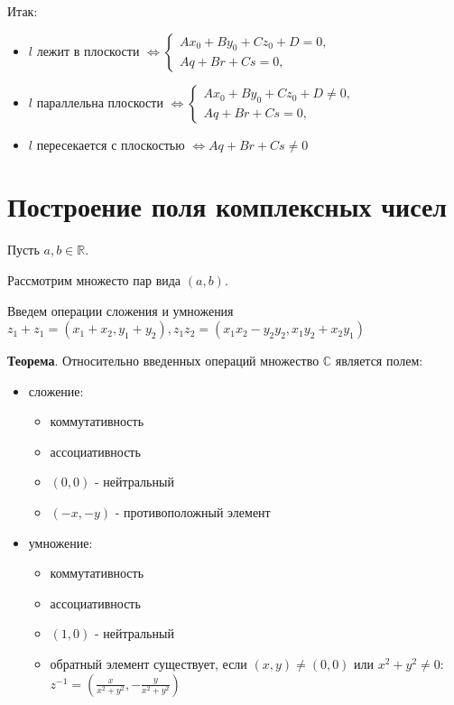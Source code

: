 \documentclass[a4paper]{article}
\begin{document}
{\begin{small}
Итак: \begin{itemize}
\item $l$ лежит в плоскости $\Leftrightarrow \begin{cases}
Ax_0 + By_0 + Cz_0 + D = 0,
\\
Aq+Br+Cs=0,
\end{cases}$
\item $l$ параллельна плоскости $\Leftrightarrow \begin{cases}
Ax_0 + By_0 + Cz_0 + D \neq 0,
\\
Aq+Br+Cs=0,
\end{cases}$
\item $l$ пересекается с плоскостью $\Leftrightarrow Aq+Br+Cs\neq 0$
\end{itemize}



\section*{Построение поля комплексных чисел}
Пусть $a,b \in \mathbb{R}$.

Рассмотрим множесто пар вида $(a,b)$.

Введем операции сложения и умножения $z_1 + z_1 = (x_1+x_2,y_1+y_2), z_1 z_2 = (x_1 x_2 -y_2 y_2, x_1 y_2 + x_2 y_1)$

\textbf{Теорема}. Относительно введенных операций множество $\mathbb{C}$ является полем:
\begin{itemize}
\item 
	сложение:\begin{itemize}
	\item коммутативность
	\item ассоциативность
	\item $(0,0)$ - нейтральный
	\item $(-x,-y)$ - противоположный элемент
	\end{itemize}

\item 
	умножение: \begin{itemize}
	\item коммутативность
	\item ассоциативность
	\item $(1,0)$ - нейтральный
	\item обратный элемент существует, если $(x,y) \neq (0,0)$ или $\displaystyle x^2+y^2 \neq 0$: $z^{-1} = \left( \frac{x}{x^2+y^2},-\frac{y}{x^2+y^2} \right)$
		\end{itemize}
		

\end{itemize}
\end{small}}
\end{document}
